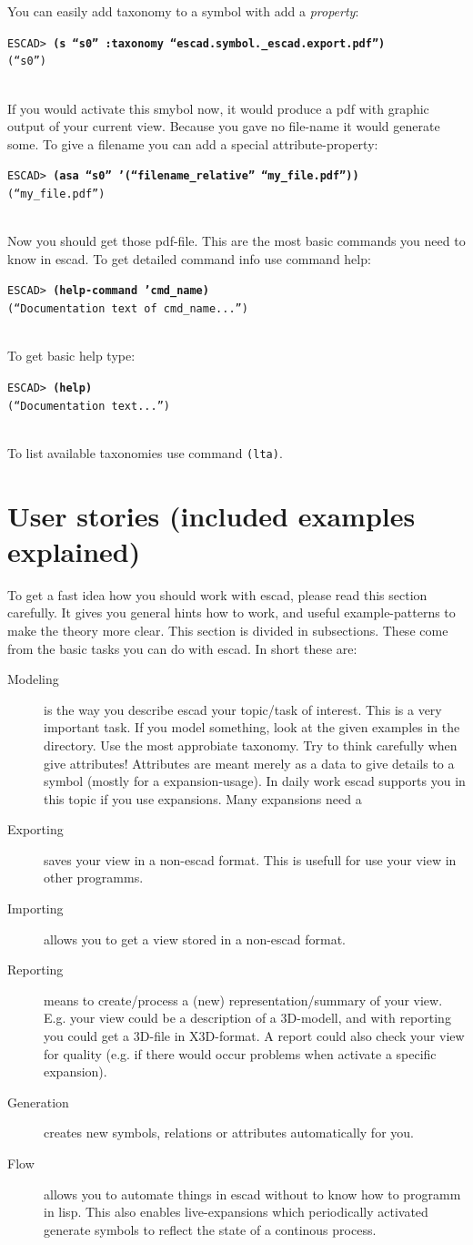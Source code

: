 \documentclass[a4paper, 12pt, openany]{scrbook}
\newcommand{\escadcmdline}[2]{\\\setlength{\fboxsep}{2pt}\colorbox{black!20}{\parbox{\textwidth}{\texttt{ESCAD> \textbf{#1}\\#2}}}\\}
\begin{document}
You can easily add taxonomy to a symbol with add a \emph{property}:
\escadcmdline{(s ``s0'' :taxonomy ``escad.symbol.\_escad.export.pdf'')}{(``s0'')}
If you would activate this smybol now, it would produce a pdf with graphic output of your current view. Because you gave no file-name it would generate some. To give a filename you can add a special attribute-property:
\escadcmdline{(asa ``s0'' '(``filename\_relative'' ``my\_file.pdf''))}{(``my\_file.pdf'')}
Now you should get those pdf-file.
This are the most basic commands you need to know in escad. To get detailed command info use command help:
\escadcmdline{(help-command 'cmd\_name)}{(``Documentation text of cmd\_name...'')}
To get basic help type:
\escadcmdline{(help)}{(``Documentation text...'')}
To list available taxonomies use command \texttt{(lta)}.
\section{User stories (included examples explained)}
To get a fast idea how you should work with escad, please read this section carefully. It gives you general hints how to work, and useful example-patterns to make the theory more clear.
This section is divided in subsections. These come from the basic tasks you can do with escad. In short these are:
\begin{description}
\item[Modeling] is the way you describe escad your topic/task of interest. This is a very important task. If you model something, look at the given examples in the  directory. Use the most approbiate taxonomy. Try to think carefully when give attributes! Attributes are meant merely as a data to give details to a symbol (mostly for a expansion-usage). In daily work escad supports you in this topic if you use expansions. Many expansions need a 
\item[Exporting] saves your view in a non-escad format. This is usefull for use your view in other programms.
\item[Importing] allows you to get a view stored in a non-escad format.
\item[Reporting] means to create/process a (new) representation/summary of your view. E.g. your view could be a description of a 3D-modell, and with reporting you could get a 3D-file in X3D-format. A report could also check your view for quality (e.g. if there would occur problems when activate a specific expansion).
\item[Generation] creates new symbols, relations or attributes automatically for you. 
\item[Flow] allows you to automate things in escad without to know how to programm in lisp. This also enables live-expansions which periodically activated generate symbols to reflect the state of a continous process.
\end{description}
\end{document}
